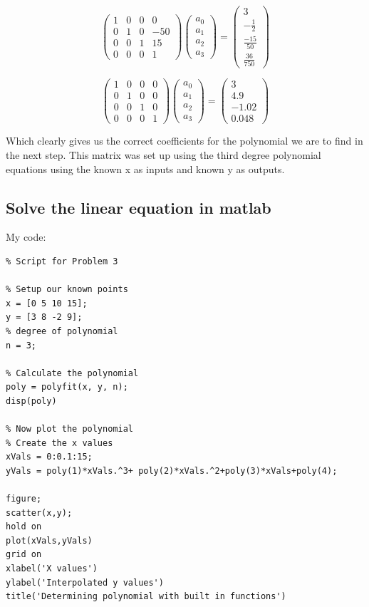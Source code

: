 \documentclass[]{article}
\begin{document}
\[
\left(\begin{array}{cccc} 
1&0&0&0\\
0&1&0&-50\\
0&0&1&15\\
0&0&0&1
\end{array}\right)
\left(\begin{array}{c} 
a_0 \\
a_1 \\
a_2 \\
a_3
\end{array}\right) =
\left(\begin{array}{c}
3 \\
-\frac12 \\
\frac{-15}{50} \\
\frac{36}{750}
\end{array}\right)
\]

\[
\left(\begin{array}{cccc} 
1&0&0&0\\
0&1&0&0\\
0&0&1&0\\
0&0&0&1
\end{array}\right)
\left(\begin{array}{c} 
a_0 \\
a_1 \\
a_2 \\
a_3
\end{array}\right) =
\left(\begin{array}{c}
3 \\
4.9 \\
-1.02 \\
0.048
\end{array}\right)
\]

Which clearly gives us the correct coefficients for the polynomial we
are to find in the next step. This matrix was set up using the third
degree polynomial equations using the known x as inputs and known y as
outputs.

\subsection{Solve the linear equation in
matlab}\label{solve-the-linear-equation-in-matlab}

My code:

\begin{verbatim}
% Script for Problem 3

% Setup our known points
x = [0 5 10 15];
y = [3 8 -2 9];
% degree of polynomial
n = 3;

% Calculate the polynomial
poly = polyfit(x, y, n);
disp(poly)

% Now plot the polynomial
% Create the x values
xVals = 0:0.1:15;
yVals = poly(1)*xVals.^3+ poly(2)*xVals.^2+poly(3)*xVals+poly(4);

figure;
scatter(x,y);
hold on
plot(xVals,yVals)
grid on
xlabel('X values')
ylabel('Interpolated y values')
title('Determining polynomial with built in functions')
\end{verbatim}
\end{document}
